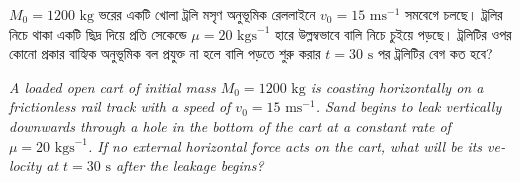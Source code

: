 \documentclass[12pt, a4paper]{article}
\begin{document}
\begin{tcolorbox}[questionbox={প্রশ্ন (Question) 33}]
\noindent
$M_0 = 1200\text{ kg}$ ভরের একটি খোলা ট্রলি মসৃণ অনুভূমিক রেললাইনে $v_0 = 15\text{ ms}^{-1}$ সমবেগে চলছে। ট্রলির নিচে থাকা একটি ছিদ্র দিয়ে প্রতি সেকেন্ডে $\mu = 20\text{ kgs}^{-1}$ হারে উল্লম্বভাবে বালি নিচে চুইয়ে পড়ছে। ট্রলিটির ওপর কোনো প্রকার বাহ্যিক অনুভূমিক বল প্রযুক্ত না হলে বালি পড়তে শুরু করার $t = 30\text{ s}$ পর ট্রলিটির বেগ কত হবে?

\vspace{0.8em}
\begin{english}
\noindent\textit{\color{darkgray}
A loaded open cart of initial mass $M_0 = 1200\text{ kg}$ is coasting horizontally on a frictionless rail track with a speed of $v_0 = 15\text{ ms}^{-1}$. Sand begins to leak vertically downwards through a hole in the bottom of the cart at a constant rate of $\mu = 20\text{ kgs}^{-1}$. If no external horizontal force acts on the cart, what will be its velocity at $t = 30\text{ s}$ after the leakage begins?
}
\end{english}
\end{tcolorbox}
\end{document}

